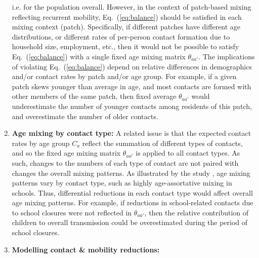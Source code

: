 \begin{enumerate}
  i.e. for the population overall.
  However, in the context of patch-based mixing reflecting recurrent mobility,
  Eq.~(\ref{eq:balance}) should be satisfied in each mixing context (patch).
  Specifically, if different patches have different age distributions,
  or different rates of per-person contact formation due to household size, employment, etc.,
  then it would not be possible to satisfy Eq.~(\ref{eq:balance})
  with a single fixed age mixing matrix $\theta_{aa'}$.
  The implications of violating Eq.~(\ref{eq:balance}) depend on
  relative differences in demographics and/or contact rates by patch and/or age group.
  For example, if a given patch skews younger than average in age,
  and most contacts are formed with other members of the same patch,
  then fixed average $\theta_{aa'}$ would
  underestimate the number of younger contacts among residents of this patch,
  and overestimate the number of older contacts.
  \item \textbf{Age mixing by contact type:}\label{issue:age-mix}
  A related issue is that the expected contact rates by age group $C_a$ reflect
  the summation of different types of contacts,
  and so the fixed age mixing matrix $\theta_{aa'}$ is applied to all contact types.
  As such, changes to the numbers of each type of contact
  are not paired with changes the overall mixing patterns.
  As illustrated by the \polymod study \cite{Mossong2008}, age mixing patterns vary by contact type,
  such as highly age-assortative mixing in schools.
  Thus, differential reductions in each contact type would affect overall age mixing patterns.
  For example, if reductions in school-related contacts due to school closures
  were not reflected in $\theta_{aa'}$,
  then the relative contribution of children to overall transmission
  could be overestimated during the period of school closures.
  \item \textbf{Modelling contact \& mobility reductions:}\label{issue:mobility}

\end{enumerate}
